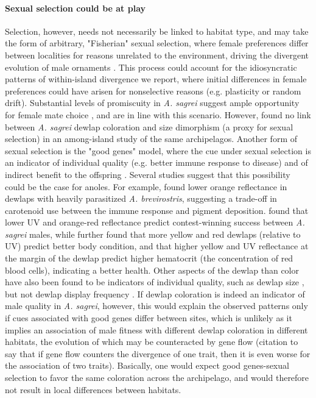\paragraph{Sexual selection could be at play} Selection, however, needs not necessarily be linked to habitat type, and may take the form of arbitrary, "Fisherian" sexual selection, where female preferences differ between localities for reasons unrelated to the environment, driving the divergent evolution of male ornaments \citep{Andersson1994}. This process could account for the idiosyncratic patterns of within-island divergence we report, where initial differences in female preferences could have arisen for nonselective reasons (e.g. plasticity or random drift). Substantial levels of promiscuity in \textit{A. sagrei} suggest ample opportunity for female mate choice \citep{Kamath2018}, and are in line with this scenario. However, \citet{Baeckens2018} found no link between \textit{A. sagrei} dewlap coloration and size dimorphism (a proxy for sexual selection) in an among-island study of the same archipelagos. Another form of sexual selection is the "good genes" model, where the cue under sexual selection is an indicator of individual quality (e.g. better immune response to disease) and of indirect benefit to the offspring \citep{Andersson1994}. Several studies suggest that this possibility could be the case for anoles. For example, \citet{Cook2013} found lower orange reflectance in dewlaps with heavily parasitized \textit{A. brevirostris}, suggesting a trade-off in carotenoid use between the immune response and pigment deposition. \citet{Steffen2014} found that lower UV and orange-red reflectance predict contest-winning success between \textit{A. sagrei} males, while \citet{Driessens2015} further found that more yellow and red dewlaps (relative to UV) predict better body condition, and that higher yellow and UV reflectance at the margin of the dewlap predict higher hematocrit (the concentration of red blood cells), indicating a better health. Other aspects of the dewlap than color have also been found to be indicators of individual quality, such as dewlap size \citep{Vanhooydonck2005, Vanhooydonck2009}, but not dewlap display frequency \citep{Tokarz2002, Tokarz2005, Driessens2015}. If dewlap coloration is indeed an indicator of male quality in \textit{A. sagrei}, however, this would explain the observed patterns only if cues associated with good genes differ between sites, which is unlikely as it implies an association of male fitness with different dewlap coloration in different habitats, the evolution of which may be counteracted by gene flow (citation to say that if gene flow counters the divergence of one trait, then it is even worse for the association of two traits). Basically, one would expect good genes-sexual selection to favor the same coloration across the archipelago, and would therefore not result in local differences between habitats.


